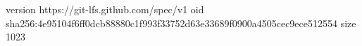 version https://git-lfs.github.com/spec/v1
oid sha256:4e95104f6ff0dcb88880c1f993f33752d63e33689f0900a4505cec9ece512554
size 1023
